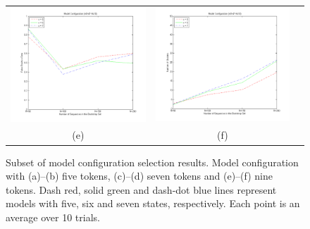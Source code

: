 \begin{figure}[t]
\begin{tabular}{ccc}
    \includegraphics[scale=0.33]{figures/m9-d7-Nc10-fp-rate} &
    \includegraphics[scale=0.33]{figures/m9-d7-Nc10-number-of-clusters} \\
    \small (e) & \small (f) 
  \end{tabular}
  \caption[Subset of model configuration selection results.]{\small
    Subset of model configuration selection results.  Model
    configuration with (a)--(b) five tokens, (c)--(d) seven tokens 
    and (e)--(f) nine tokens. Dash red, solid green and dash-dot blue 
    lines represent models with five, six and seven states, respectively.  
    Each point is an average over 10 trials.}
  \label{fig:batch-some-clustering-results}
\end{figure}

